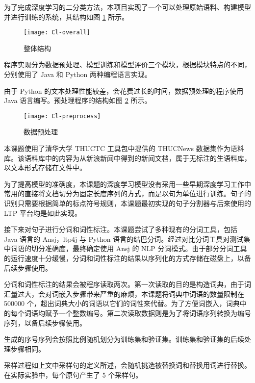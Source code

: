 \label{s:classifer implementation}
为了完成深度学习的二分类方法，本项目实现了一个可以处理原始语料、构建模型并进行训练的系统，其结构如图 \ref{f:classfier overall} 所示。
\begin{figure}[h]
	\centering
	\texttt{[image: Cl-overall]}
	\caption{整体结构}
	\label{f:classfier overall}
	\vspace{-1em}
\end{figure}

程序实现分为数据预处理、模型训练和模型评价三个模块，根据模块特点的不同，分别使用了 Java 和 Python 两种编程语言实现。

\label{s:classfier preprocess}
由于 Python 的文本处理性能较差，会花费过长的时间，数据预处理的程序使用 Java 语言编写。预处理程序的结构如图 \ref{f:classfier preprocess} 所示。

\begin{figure}[h]
	\centering
	\texttt{[image: Cl-preprocess]}
	\caption{数据预处理}
	\label{f:classfier preprocess}
	\vspace{-1em}
\end{figure}

本课题使用了清华大学 THUCTC 工具包中提供的 THUCNews 数据集作为语料库。该语料库中的内容为从新浪新闻中得到的新闻文档，属于无标注的生语料库，以文本形式存储在文件中。

为了提高模型的准确度，本课题的深度学习模型没有采用一些早期深度学习工作中常用的直接将文档切分为固定长度序列的方式，而是以句为单位进行训练。句子的识别只需要根据简单的标点符号规则，本课题最初实现的句子分割器与后来使用的 LTP 平台均是如此实现。

接下来对句子进行分词和词性标注。本课题尝试了多种现有的分词工具，包括 Java 语言的 Ansj，ltp4j 与 Python 语言的结巴分词。经过对比分词工具对测试集中词语的切分准确度，最终确定使用 Ansj 的 NLP 分词模式。由于部分分词工具的运行速度十分缓慢，分词和词性标注的结果以序列化的方式存储在磁盘上，以备后续步骤使用。

分词和词性标注的结果会被程序读取两次。第一次读取的目的是构造词典，由于词汇量过大，会对词嵌入步骤带来严重的麻烦，本课题将词典中词语的数量限制在 500000 个，超出词典大小的词语以它们的词性来代替。为了方便词嵌入，词典中的每个词语均赋予一个整数编号。第二次读取数据则是为了将词语序列转换为编号序列，以备后续步骤使用。

生成的序号序列会按照比例随机划分为训练集和验证集。训练集和验证集的后续处理步骤相同。

采样过程如上文中采样句的定义所述，会随机挑选被替换词和替换用词进行替换。在实际实验中，每个原句产生了 5 个采样句。

